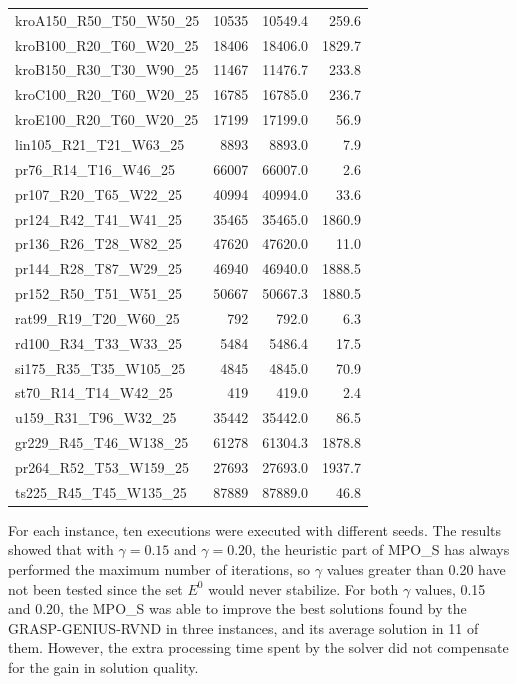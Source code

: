 \documentclass{singlecol-new}
\theoremstyle{TH}{
\newtheorem{lemma}{Lemma}
\newtheorem{theorem}[lemma]{Theorem}
\newtheorem{corrolary}[lemma]{Corrolary}
\newtheorem{conjecture}[lemma]{Conjecture}
\newtheorem{proposition}[lemma]{Proposition}
\newtheorem{claim}[lemma]{Claim}
\newtheorem{stheorem}[lemma]{Wrong Theorem}
}
\theoremstyle{THrm}{
\newtheorem{definition}{Definition}[section]
\newtheorem{question}{Question}[section]
\newtheorem{remark}{Remark}
\newtheorem{scheme}{Scheme}
}
\theoremstyle{THhit}{
\newtheorem{case}{Case}[section]
}
\begin{document}
\begin{table}[h]
\begin{tabular}{lrrr}
kroA150\_R50\_T50\_W50\_25  & 10535   & 10549.4   & 259.6    \\
kroB100\_R20\_T60\_W20\_25  & 18406   & 18406.0   & 1829.7   \\
kroB150\_R30\_T30\_W90\_25  & 11467   & 11476.7   & 233.8    \\
kroC100\_R20\_T60\_W20\_25  & 16785   & 16785.0   & 236.7    \\
kroE100\_R20\_T60\_W20\_25  & 17199   & 17199.0   & 56.9     \\
lin105\_R21\_T21\_W63\_25   & 8893    & 8893.0    & 7.9      \\
pr76\_R14\_T16\_W46\_25     & 66007   & 66007.0   & 2.6      \\
pr107\_R20\_T65\_W22\_25    & 40994   & 40994.0   & 33.6     \\
pr124\_R42\_T41\_W41\_25    & 35465   & 35465.0   & 1860.9   \\
pr136\_R26\_T28\_W82\_25    & 47620   & 47620.0   & 11.0     \\
pr144\_R28\_T87\_W29\_25    & 46940   & 46940.0   & 1888.5   \\
pr152\_R50\_T51\_W51\_25    & 50667   & 50667.3   & 1880.5   \\
rat99\_R19\_T20\_W60\_25    & 792     & 792.0     & 6.3      \\
rd100\_R34\_T33\_W33\_25    & 5484    & 5486.4    & 17.5     \\
si175\_R35\_T35\_W105\_25   & 4845    & 4845.0    & 70.9     \\
st70\_R14\_T14\_W42\_25     & 419     & 419.0     & 2.4      \\
u159\_R31\_T96\_W32\_25     & 35442   & 35442.0   & 86.5     \\
gr229\_R45\_T46\_W138\_25   & 61278   & 61304.3   & 1878.8   \\
pr264\_R52\_T53\_W159\_25   & 27693   & 27693.0   & 1937.7   \\
ts225\_R45\_T45\_W135\_25   & 87889   & 87889.0   & 46.8    \\
\hline
\end{tabular}
\end{table}

For each instance, ten executions were executed with different seeds. The results showed that with $ \gamma = 0.15 $ and $ \gamma = 0.20 $, the heuristic part of MPO\_S has always performed the maximum number of iterations, so $ \gamma$ values greater than 0.20 have not been tested since the set $ E^0$ would never stabilize. For both $\gamma$ values, 0.15 and 0.20, the MPO\_S was able to improve the best solutions found by the GRASP-GENIUS-RVND in three instances, and its average solution in 11 of them. However, the extra processing time spent by the solver did not compensate for the gain in solution quality.
\end{document}
